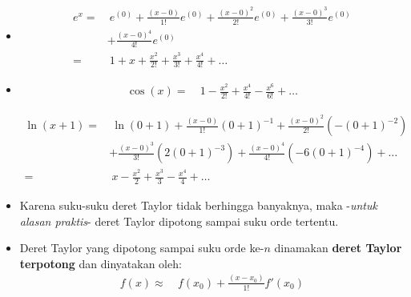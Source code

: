 \documentclass[pdflatex,compress]{beamer}
\begin{document}
\begin{frame}
	\begin{itemize}
		\item[]
		\begin{align*}
			e^x =&~ e^{(0)} + \frac{(x-0)}{1!}e^{(0)} + \frac{(x-0)^2}{2!}e^{(0)} + \frac{(x-0)^3}{3!}e^{(0)} \\
			&+ \frac{(x-0)^4}{4!}e^{(0)} \\
			=&~ 1 + x + \frac{x^2}{2!} + \frac{x^3}{3!} + \frac{x^4}{4!} + \dots
		\end{align*}
	\end{itemize}
\end{frame}

\begin{frame}
	\begin{itemize}
		\item[]
		\begin{align*}
			\cos(x) =&~ 1 - \frac{x^2}{2!} + \frac{x^4}{4!} - \frac{x^6}{6!} + \dots
		\end{align*}
	
		\begin{align*}
			\ln(x+1) =&~ \ln(0+1) + \frac{(x-0)}{1!}(0+1)^{-1} + \frac{(x-0)^2}{2!}(-(0+1)^{-2}) \\
			&+ \frac{(x-0)^3}{3!}(2(0+1)^{-3}) + \frac{(x-0)^4}{4!}(-6(0+1)^{-4}) + \dots \\
			=&~ x - \frac{x^2}{2} + \frac{x^3}{3} - \frac{x^4}{4} + \dots
		\end{align*}
	\end{itemize}
\end{frame}

\begin{frame}
	\begin{itemize}
		\item Karena suku-suku deret Taylor tidak berhingga banyaknya, maka -\textit{untuk alasan praktis}- deret Taylor dipotong sampai suku orde tertentu.
		\item Deret Taylor yang dipotong sampai suku orde ke-$ n $ dinamakan \textbf{deret Taylor terpotong} dan dinyatakan oleh:
		\begin{align*}
			f(x) \approx&~f(x_0) + \frac{(x-x_0)}{1!}f'(x_0)
		\end{align*}
	\end{itemize}
\end{frame}
	
\end{document}
